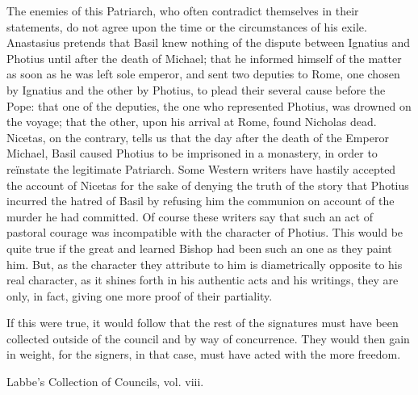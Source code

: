 The enemies of this Patriarch, who often contradict themselves in their statements, do not agree upon the time or the circumstances of his exile. Anastasius pretends that Basil knew nothing of the dispute between Ignatius and Photius until after the death of Michael; that he informed himself of the matter as soon as he was left sole emperor, and sent two deputies to Rome, one chosen by Ignatius and the other by Photius, to plead their several cause before the Pope: that one of the deputies, the one who represented Photius, was drowned on the voyage; that the other, upon his arrival at Rome, found Nicholas dead. Nicetas, on the contrary, tells us that the day after the death of the Emperor Michael, Basil caused Photius to be imprisoned in a monastery, in order to reïnstate the legitimate Patriarch. Some Western writers have hastily accepted the account of Nicetas for the sake of denying the truth of the story that Photius incurred the hatred of Basil by refusing him the communion on account of the murder he had committed. Of course these writers say that such an act of pastoral courage was incompatible with the character of Photius. This would be quite true if the great and learned Bishop had been such an one as they paint him. But, as the character they attribute to him is diametrically opposite to his real character, as it shines forth in his authentic acts and his writings, they are only, in fact, giving one more proof of their partiality.

If this were true, it would follow that the rest of the signatures must have been collected outside of the council and by way of concurrence. They would then gain in weight, for the signers, in that case, must have acted with the more freedom.

Labbe’s Collection of Councils, vol. viii.

